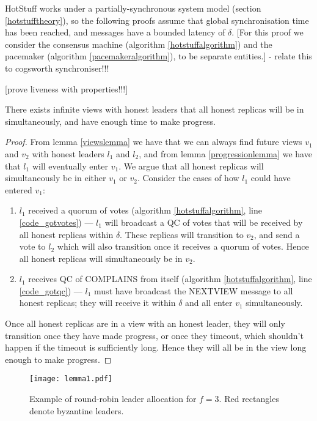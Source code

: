 HotStuff works under a partially-synchronous system model (section \ref{hotstufftheory}), so the following proofs assume that global synchronisation time has been reached, and messages have a bounded latency of $\delta$.
[For this proof we consider the consensus machine (algorithm \ref{hotstuffalgorithm}) and the pacemaker (algorithm \ref{pacemakeralgorithm}), to be separate entities.] - relate this to cogsworth synchroniser!!!

[prove liveness with properties!!!]

\begin{theorem} \label{viewsync}
	There exists infinite views with honest leaders that all honest replicas will be in simultaneously, and have enough time to make progress.
\end{theorem}

\begin{proof}
	From lemma \ref{viewslemma} we have that we can always find future views $v_1$ and $v_2$ with honest leaders $l_1$ and $l_2$, and from lemma \ref{progressionlemma} we have that $l_1$ will eventually enter $v_1$. We argue that all honest replicas will simultaneously be in either $v_1$ or $v_2$. Consider the cases of how $l_1$ could have entered $v_1$:
	\begin{enumerate}
		\item $l_1$ received a quorum of votes (algorithm \ref{hotstuffalgorithm}, line \ref{code_gotvotes}) --- $l_1$ will broadcast a QC of votes that will be received by all honest replicas within $\delta$. These replicas will transition to $v_2$, and send a vote to $l_2$ which will also transition once it receives a quorum of votes. Hence all honest replicas will simultaneously be in $v_2$.
		\item $l_1$ receives QC of COMPLAINS from itself (algorithm \ref{hotstuffalgorithm}, line \ref{code_gotqc}) --- $l_1$ must have broadcast the NEXT{\large V}IEW message to all honest replicas; they will receive it within $\delta$ and all enter $v_1$ simultaneously.
	\end{enumerate}
	Once all honest replicas are in a view with an honest leader, they will only transition once they have made progress, or once they timeout, which shouldn't happen if the timeout is sufficiently long. Hence they will all be in the view long enough to make progress.
\end{proof}

\begin{figure}[h!]
	\centering
	\texttt{[image: lemma1.pdf]}
	\caption{Example of round-robin leader allocation for $f = 3$. Red rectangles denote byzantine leaders.}
	\label{lemma1diagram}
\end{figure}

